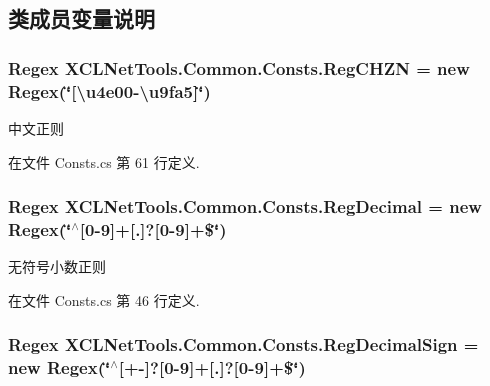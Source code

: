 \subsection{类成员变量说明}
\hypertarget{class_x_c_l_net_tools_1_1_common_1_1_consts_aeb4f95ff285059a276d3191ada22bce5}{
\subsubsection[{Reg\-C\-H\-Z\-N}]{\setlength{\rightskip}{0pt plus 5cm}Regex X\-C\-L\-Net\-Tools.\-Common.\-Consts.\-Reg\-C\-H\-Z\-N = new Regex(\char`\"{}\mbox{[}\textbackslash{}u4e00-\/\textbackslash{}u9fa5\mbox{]}\char`\"{})\hspace{0.3cm}{\ttfamily [static]}}}\label{class_x_c_l_net_tools_1_1_common_1_1_consts_aeb4f95ff285059a276d3191ada22bce5}


中文正则 



在文件 Consts.\-cs 第 61 行定义.

\hypertarget{class_x_c_l_net_tools_1_1_common_1_1_consts_ae458af39aa12dc5dc1ec960a8c885aa5}{
\subsubsection[{Reg\-Decimal}]{\setlength{\rightskip}{0pt plus 5cm}Regex X\-C\-L\-Net\-Tools.\-Common.\-Consts.\-Reg\-Decimal = new Regex(\char`\"{}$^\wedge$\mbox{[}0-\/9\mbox{]}+\mbox{[}.\mbox{]}?\mbox{[}0-\/9\mbox{]}+\$\char`\"{})\hspace{0.3cm}{\ttfamily [static]}}}\label{class_x_c_l_net_tools_1_1_common_1_1_consts_ae458af39aa12dc5dc1ec960a8c885aa5}


无符号小数正则 



在文件 Consts.\-cs 第 46 行定义.

\hypertarget{class_x_c_l_net_tools_1_1_common_1_1_consts_a06acd9076fbb4b584a984142589eca11}{
\subsubsection[{Reg\-Decimal\-Sign}]{\setlength{\rightskip}{0pt plus 5cm}Regex X\-C\-L\-Net\-Tools.\-Common.\-Consts.\-Reg\-Decimal\-Sign = new Regex(\char`\"{}$^\wedge$\mbox{[}+-\/\mbox{]}?\mbox{[}0-\/9\mbox{]}+\mbox{[}.\mbox{]}?\mbox{[}0-\/9\mbox{]}+\$\char`\"{})\hspace{0.3cm}{\ttfamily [static]}}}\label{class_x_c_l_net_tools_1_1_common_1_1_consts_a06acd9076fbb4b584a984142589eca11}


